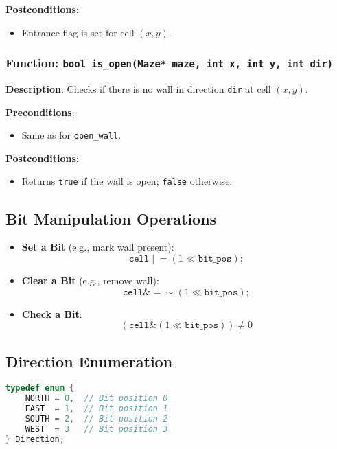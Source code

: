 \documentclass{article}
\begin{document}
\textbf{Postconditions}:
\begin{itemize}[noitemsep]
    \item Entrance flag is set for cell $(x, y)$.
\end{itemize}

\subsubsection*{Function: \texttt{bool is\_open(Maze* maze, int x, int y, int dir)}}

\textbf{Description}: Checks if there is no wall in direction \texttt{dir} at cell $(x, y)$.

\textbf{Preconditions}:
\begin{itemize}[noitemsep]
    \item Same as for \texttt{open\_wall}.
\end{itemize}

\textbf{Postconditions}:
\begin{itemize}[noitemsep]
    \item Returns \texttt{true} if the wall is open; \texttt{false} otherwise.
\end{itemize}

\subsection*{Bit Manipulation Operations}

\begin{itemize}[noitemsep]
    \item \textbf{Set a Bit} (e.g., mark wall present):
    \[
    \texttt{cell} \mathrel{|}= (1 \ll \texttt{bit\_pos});
    \]
    \item \textbf{Clear a Bit} (e.g., remove wall):
    \[
    \texttt{cell} \mathrel{\&}= \sim(1 \ll \texttt{bit\_pos});
    \]
    \item \textbf{Check a Bit}:
    \[
    (\texttt{cell} \& (1 \ll \texttt{bit\_pos})) \neq 0
    \]
\end{itemize}

\subsection*{Direction Enumeration}

\begin{lstlisting}[language=C]
typedef enum {
    NORTH = 0,  // Bit position 0
    EAST  = 1,  // Bit position 1
    SOUTH = 2,  // Bit position 2
    WEST  = 3   // Bit position 3
} Direction;
\end{lstlisting}
\end{document}
